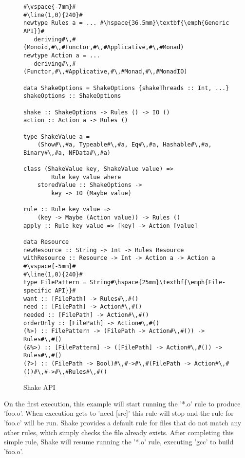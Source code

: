 \begin{figure}
\begin{lstlisting}
#\vspace{-7mm}#
#\line(1,0){240}#
newtype Rules a = ... #\hspace{36.5mm}\textbf{\emph{Generic API}}#
   deriving#\,#(Monoid,#\,#Functor,#\,#Applicative,#\,#Monad)
newtype Action a = ...
   deriving#\,#(Functor,#\,#Applicative,#\,#Monad,#\,#MonadIO)

data ShakeOptions = ShakeOptions {shakeThreads :: Int, ...}
shakeOptions :: ShakeOptions

shake :: ShakeOptions -> Rules () -> IO ()
action :: Action a -> Rules ()

type ShakeValue a =
    (Show#\,#a, Typeable#\,#a, Eq#\,#a, Hashable#\,#a, Binary#\,#a, NFData#\,#a)

class (ShakeValue key, ShakeValue value) =>
        Rule key value where
    storedValue :: ShakeOptions ->
        key -> IO (Maybe value)

rule :: Rule key value =>
    (key -> Maybe (Action value)) -> Rules ()
apply :: Rule key value => [key] -> Action [value]

data Resource
newResource :: String -> Int -> Rules Resource
withResource :: Resource -> Int -> Action a -> Action a
#\vspace{-5mm}#
#\line(1,0){240}#
type FilePattern = String#\hspace{25mm}\textbf{\emph{File-specific API}}#
want :: [FilePath] -> Rules#\,#()
need :: [FilePath] -> Action#\,#()
needed :: [FilePath] -> Action#\,#()
orderOnly :: [FilePath] -> Action#\,#()
(%>) :: FilePattern -> (FilePath -> Action#\,#()) -> Rules#\,#()
(&%>) :: [FilePattern] -> ([FilePath] -> Action#\,#()) -> Rules#\,#()
(?>) :: (FilePath -> Bool)#\,#->#\,#(FilePath -> Action#\,#())#\,#->#\,#Rules#\,#()
\end{lstlisting}
\caption{Shake API\label{fig:shake-api}}
\vspace{-3mm}
\end{figure}

On the first execution, this example will start running the \lst'*.o' rule to
produce \lst'foo.o'. When execution gets to \lst'need [src]' this rule will stop
and the rule for \lst'foo.c' will be run. Shake provides a default rule for
files that do not match any other rules, which simply checks the file already
exists. After completing this simple rule, Shake will resume running the
\lst'*.o' rule, executing \lst'gcc' to build \lst'foo.o'.

